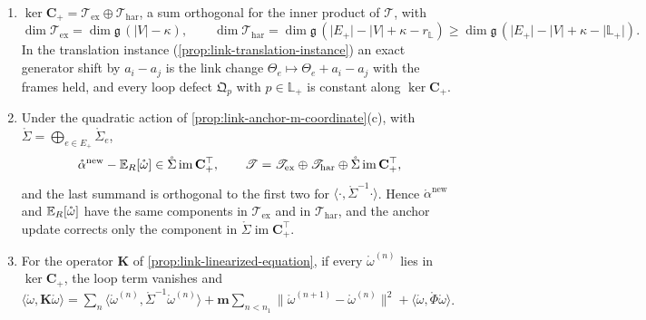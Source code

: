 \begin{enumerate}
\item[(a)] $\ker\mathbf C_+=\mathscr T_{\mathrm{ex}}\oplus\mathscr T_{\mathrm{har}}$, a sum orthogonal for the
inner product of $\mathscr T$, with
\begin{equation}
\dim\mathscr T_{\mathrm{ex}}=\dim\mathfrak g\,(\lvert V\rvert-\kappa),
\qquad
\dim\mathscr T_{\mathrm{har}}=\dim\mathfrak g\,(\lvert E_+\rvert-\lvert V\rvert+\kappa-r_{\mathbb L})
\geq\dim\mathfrak g\,(\lvert E_+\rvert-\lvert V\rvert+\kappa-\lvert\mathbb L_+\rvert).
\label{eq:link-cycle-splitting-dims}
\end{equation}
In the translation instance (\cref{prop:link-translation-instance}) an exact generator shift by
$a_i-a_j$ is the link change $\Theta_e\mapsto\Theta_e+a_i-a_j$ with the frames held, and every loop
defect $\mathfrak Q_p$ with $p\in\mathbb L_+$ is constant along $\ker\mathbf C_+$.
\item[(b)] Under the quadratic action of \cref{prop:link-anchor-m-coordinate}(c), with
$\mathring\Sigma=\bigoplus_{e\in E_+}\mathring\Sigma_e$,
\begin{equation}
\mathring\alpha^{\mathrm{new}}-\mathbb E_R[\mathring\omega]\in\mathring\Sigma\operatorname{im}\mathbf C_+^\top,
\qquad
\mathscr T=\mathscr T_{\mathrm{ex}}\oplus\mathscr T_{\mathrm{har}}\oplus\mathring\Sigma\operatorname{im}\mathbf C_+^\top,
\label{eq:link-anchor-coexact}
\end{equation}
and the last summand is orthogonal to the first two for
$\langle\cdot,\mathring\Sigma^{-1}\cdot\rangle$. Hence $\mathring\alpha^{\mathrm{new}}$ and $\mathbb E_R[\mathring\omega]$ have
the same components in $\mathscr T_{\mathrm{ex}}$ and in $\mathscr T_{\mathrm{har}}$, and the anchor
update corrects only the component in $\mathring\Sigma\operatorname{im}\mathbf C_+^\top$.
\item[(c)] For the operator $\mathbf K$ of \cref{prop:link-linearized-equation}, if every
$\mathring\omega^{(n)}$ lies in $\ker\mathbf C_+$, the loop term vanishes and
$\langle\mathring\omega,\mathbf K\mathring\omega\rangle=\sum_n\langle\mathring\omega^{(n)},\mathring\Sigma^{-1}\mathring\omega^{(n)}\rangle
+\mathbf m\sum_{n<n_1}\lVert\mathring\omega^{(n+1)}-\mathring\omega^{(n)}\rVert^2+\langle\mathring\omega,\mathring\Phi\mathring\omega\rangle$.
\end{enumerate}

